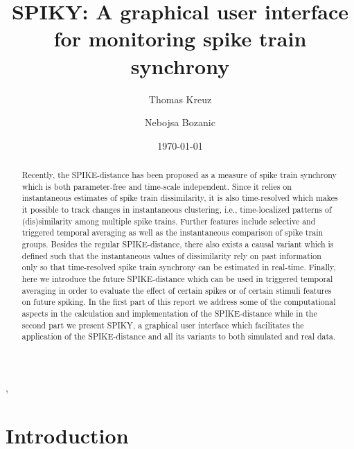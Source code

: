 \documentclass[10pt,twocolumn]{elsart5p}
\begin{document}
\begin{frontmatter}

\title{SPIKY: A graphical user interface for monitoring spike train synchrony}

\author{Thomas Kreuz},
\author{Nebojsa Bozanic}

\address{Institute for complex systems, CNR, Sesto Fiorentino, Italy}


\date{\today}

\begin{abstract}
    Recently, the SPIKE-distance has been proposed as a measure of spike train synchrony which is both parameter-free and time-scale independent. Since it relies on instantaneous estimates of spike train dissimilarity, it is also time-resolved which makes it possible to track changes in instantaneous clustering, i.e., time-localized patterns of (dis)similarity among multiple spike trains. Further features include selective and triggered temporal averaging as well as the instantaneous comparison of spike train groups. Besides the regular SPIKE-distance, there also exists a causal variant which is defined such that the instantaneous values of dissimilarity rely on past information only so that time-resolved spike train synchrony can be estimated in real-time. Finally, here we introduce the future SPIKE-distance which can be used in triggered temporal averaging in order to evaluate the effect of certain spikes or of certain stimuli features on future spiking. In the first part of this report we address some of the computational aspects in the calculation and implementation of the SPIKE-distance while in the second part we present SPIKY, a graphical user interface which facilitates the application of the SPIKE-distance and all its variants to both simulated and real data.
\end{abstract}



\end{frontmatter}

\newcommand{\abb}{\small\sf}

%
%
\section{\label{s:Intro} Introduction}
\end{document}
